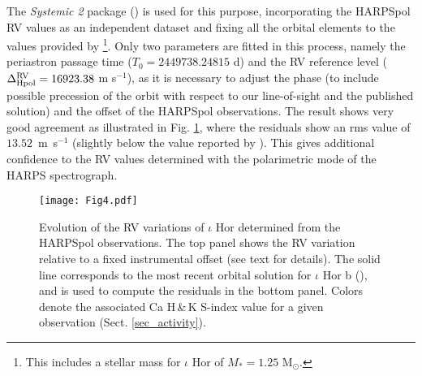 \documentclass[a4paper,fleqn,usenatbib]{mnras}
\begin{document}
The \textit{Systemic 2} package () is used for this purpose, incorporating the HARPSpol RV values as an independent dataset and fixing all the orbital elements to the values provided by \footnote[16]{This includes a stellar mass for $\iota$ Hor of $M_{*} = 1.25$ M$_{\odot}$.}. Only two parameters are fitted in this process, namely the periastron passage time ($T_{0} = 2449738.24815$ d) and the RV reference level ($\Delta_{\rm Hpol}^{\rm RV} = 16923.38$ m s$^{-1}$), as it is necessary to adjust the phase (to include possible precession of the orbit with respect to our line-of-sight and the published solution) and the offset of the HARPSpol observations. The result shows very good agreement as illustrated in Fig. \ref{fig_4}, where the residuals show an rms value of $13.52$~m~s$^{-1}$ (slightly below the value reported by ). This gives additional confidence to the RV values determined with the polarimetric mode of the HARPS spectrograph.       

\begin{figure} %
\texttt{[image: Fig4.pdf]}
\caption{Evolution of the RV variations of $\iota$ Hor determined from the HARPSpol observations. The top panel shows the RV variation relative to a fixed instrumental offset (see text for details). The solid line corresponds to the most recent orbital solution for $\iota$ Hor b (), and is used to compute the residuals in the bottom panel. Colors denote the associated Ca H\,\&\,K S-index value for a given observation (Sect. \ref{sec_activity}).}\label{fig_4}
\end{figure}
\end{document}
